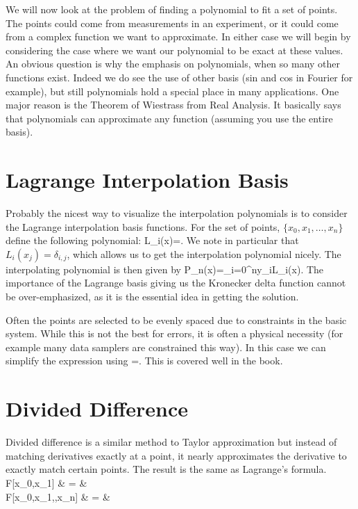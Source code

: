 We will now look at the problem of finding a polynomial to fit a set 
of points.  The points could come from measurements in an experiment, 
or it could come from a complex function we want to approximate.  In 
either case we will begin by considering the case where we want our 
polynomial to be exact at these values.  An obvious question is why 
the emphasis on polynomials, when so many other functions exist.  
Indeed we do see the use of other basis (sin and cos in Fourier for 
example), but still polynomials hold a special place in many 
applications.  One major reason is the Theorem of Wiestrass from Real 
Analysis.  It basically says that polynomials can approximate any 
function (assuming you use the entire basis).

\section{Lagrange Interpolation Basis}
Probably the nicest way to visualize the interpolation polynomials is 
to consider the Lagrange interpolation basis functions.  For the set 
of points, $\{x_{0}, x_{1}, \ldots, x_{n}\}$ define the following polynomial:
\beqn
L_{i}(x)=.
\eeqn
We note in particular that $L_{i}(x_{j})=\delta_{i,j}$, which allows 
us to get the interpolation polynomial nicely.  The interpolating polynomial 
is then given by
\beqn
P_{n}(x)=\sum_{i=0}^{n}y_{i}L_{i}(x).
\eeqn
The importance of the Lagrange basis giving us the Kronecker delta 
function cannot be over-emphasized, as it is the essential idea in 
getting the solution.

Often the points are selected to be evenly spaced due to constraints 
in the basic system.  While this is not the best for errors, it is 
often a physical necessity (for example many data samplers are 
constrained this way).  In this case we can simplify the expression 
using 
\beqn
\mu=.
\eeqn
This is covered well in the book.

\section{Divided Difference}
Divided difference is a similar method to Taylor approximation but 
instead of matching derivatives exactly at a point, it nearly 
approximates the derivative to exactly match certain points.  The 
result is the same as Lagrange's formula.
\beqn
F[x_{0},x_{1}] & = &  \\
F[x_{0},x_{1},\cdots,x_{n}]
 & = & 
\eeqn

